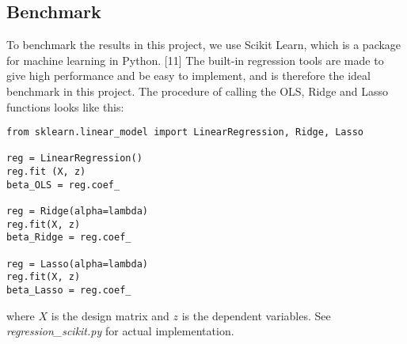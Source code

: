 \subsection{Benchmark}
To benchmark the results in this project, we use Scikit Learn, which is a package for machine learning in Python. [11] The built-in regression tools are made to give high performance and be easy to implement, and is therefore the ideal benchmark in this project. The procedure of calling the OLS, Ridge and Lasso functions looks like this:
\lstset{basicstyle=\scriptsize}
\begin{lstlisting}
from sklearn.linear_model import LinearRegression, Ridge, Lasso

reg = LinearRegression()
reg.fit (X, z) 
beta_OLS = reg.coef_

reg = Ridge(alpha=lambda)
reg.fit(X, z)
beta_Ridge = reg.coef_

reg = Lasso(alpha=lambda)
reg.fit(X, z)
beta_Lasso = reg.coef_
\end{lstlisting}
where $X$ is the design matrix and $z$ is the dependent variables. See \textit{regression\_scikit.py} for actual implementation. 